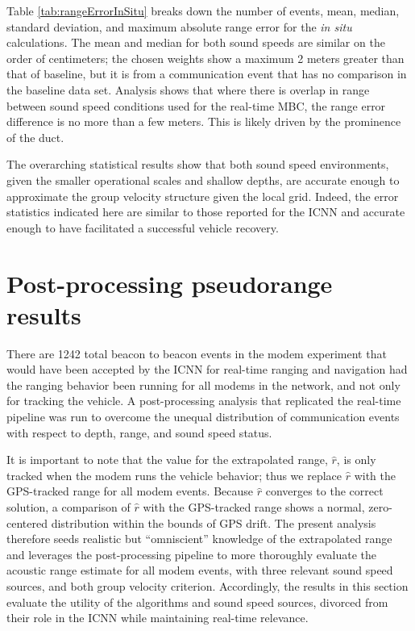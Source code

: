 Table \ref{tab:rangeErrorInSitu} breaks down the number of events, mean, median, standard deviation, and maximum absolute range error for the \textit{in situ} calculations.
The mean and median for both sound speeds are similar on the order of centimeters; the chosen weights show a maximum 2 meters greater than that of baseline, but it is from a communication event that has no comparison in the baseline data set.
Analysis shows that where there is overlap in range between sound speed conditions used for the real-time MBC, the range error difference is no more than a few meters.
 This is likely driven by the prominence of the duct.

The overarching statistical results show that both sound speed environments, given the smaller operational scales and shallow depths, are accurate enough to approximate the group velocity structure given the local grid.
Indeed, the error statistics indicated here are similar to those reported for the ICNN \citep{randeni_high-resolution_2021} and accurate enough to have facilitated a successful vehicle recovery.

\FloatBarrier
\section{\label{sec:postprocess} Post-processing pseudorange results}

There are 1242 total beacon to beacon events in the modem experiment that would have been accepted by the ICNN for real-time ranging and navigation had the ranging behavior been running for all modems in the network, and not only for tracking the vehicle.
A post-processing analysis that replicated the real-time pipeline was run to overcome the unequal distribution of communication events with respect to depth, range, and sound speed status.

It is important to note that the value for the extrapolated range, $\hat{r}$, is only tracked when the modem runs the vehicle behavior; thus we replace $\hat{r}$ with the GPS-tracked range for all modem events.
Because $\hat{r}$ converges to the correct solution, a comparison of $\hat{r}$ with the GPS-tracked range shows a normal, zero-centered distribution within the bounds of GPS drift.
The present analysis therefore seeds realistic but ``omniscient'' knowledge of the extrapolated range and leverages the post-processing pipeline to more thoroughly evaluate the acoustic range estimate for all modem events, with three relevant sound speed sources, and both group velocity criterion.
Accordingly, the results in this section evaluate the utility of the algorithms and sound speed sources, divorced from their role in the ICNN while maintaining real-time relevance.

